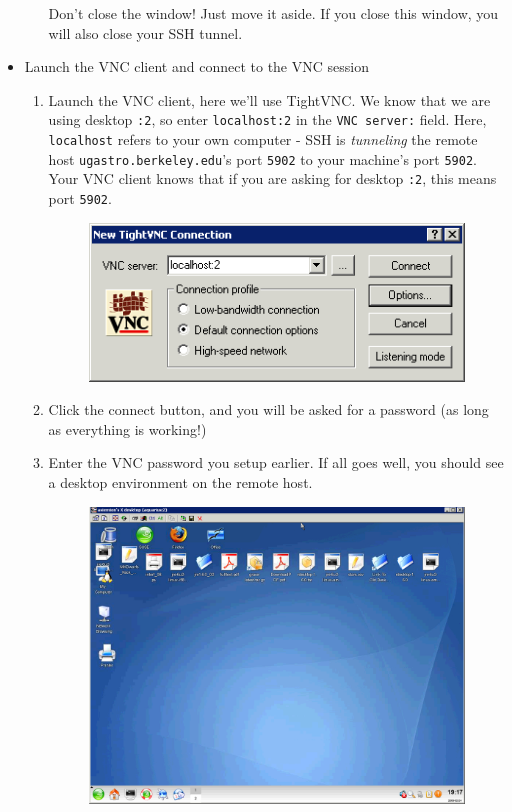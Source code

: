 \documentclass[11pt,preprint]{aastex}
\begin{document}
\begin{itemize}
\begin{enumerate}
Don't close the window!  Just move it aside.  If you close this window, you will also close your SSH tunnel.
\end{enumerate}
\item Launch the VNC client and connect to the VNC session
\begin{enumerate}
\item Launch the VNC client, here we'll use TightVNC.  We know that we are using desktop \verb$:2$, so enter \verb$localhost:2$ in the \verb$VNC server:$ field.  Here, \verb$localhost$ refers to your own 
computer - SSH is \emph{tunneling} the remote host \verb$ugastro.berkeley.edu$'s port \verb$5902$ to your machine's port \verb$5902$.  Your VNC client knows that if you are asking for desktop \verb$:2$, this means port \verb$5902$.
\begin{figure}[h!]
\begin{center}
\includegraphics[scale=0.6]{putty5a.png}
\end{center}
\end{figure}
\item Click the connect button, and you will be asked for a password (as long as everything is working!)
\\
\item Enter the VNC password you setup earlier.  If all goes well, you should see a desktop environment on the remote host.
\\
\begin{figure}[h!]
\begin{center}
\includegraphics[scale=0.4]{putty7a.png}

\end{center}
\end{figure}
\end{enumerate}
\end{itemize}
\end{document}
